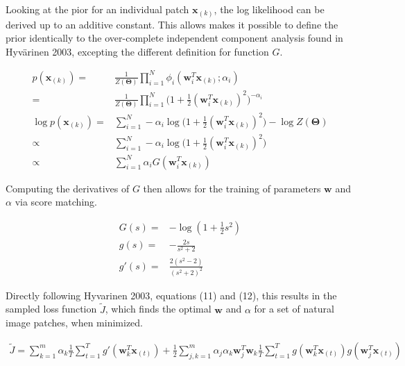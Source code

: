 \documentclass{article}
\begin{document}
Looking at the pior for an individual patch $\mathbf{x}_{(k)}$, the log likelihood can be derived up to an additive constant. This allows makes it possible to define the prior identically to the over-complete independent component analysis found in Hyvärinen 2003, excepting the different definition for function $G$. 

\begin{equation}
\begin{aligned}
	p(\mathbf{x}_{(k)}) =& \frac{1}{Z(\bm{\Theta})} \prod_{i=1}^{N} \phi_i (\mathbf{w}_i^T \mathbf{x}_{(k)} ; \alpha_i) \\
	=& \frac{1}{Z(\bm{\Theta})} \prod_{i=1}^{N} \bigg( 1 + \frac{1}{2}(\mathbf{w}_i^T \mathbf{x}_{(k)})^2 \bigg)^{-\alpha_i} \\
	\log p(\mathbf{x}_{(k)}) =& \sum_{i=1}^{N} -\alpha_i \log \bigg( 1 + \frac{1}{2}(\mathbf{w}_i^T \mathbf{x}_{(k)})^2 \bigg)  - \log Z(\bm{\Theta}) \\
	\propto& \sum_{i=1}^{N} -\alpha_i \log \bigg( 1 + \frac{1}{2}(\mathbf{w}_i^T \mathbf{x}_{(k)})^2 \bigg) \\
		\propto& \sum_{i=1}^{N} \alpha_i G(\mathbf{w}_i^T \mathbf{x}_{(k)})
\end{aligned}
\end{equation}

Computing the derivatives of $G$ then allows for the training of parameters $\mathbf{w}$ and $\alpha$ via score matching.


\begin{equation}
\begin{aligned}
	G(s) =& - \log(1 + \frac{1}{2} s^2) \\
	g(s) =& - \frac{2s}{s^2 + 2} \\
	g'(s) =& \frac{2(s^2 - 2)}{(s^2 + 2)^2}
\end{aligned}
\end{equation}

Directly following Hyvarinen 2003, equations (11) and (12), this results in the sampled loss function $\tilde{J}$, which finds the optimal $\mathbf{w}$ and $\alpha$ for a set of natural image patches, when minimized.

\begin{equation}
\begin{aligned}
\tilde{J} = \sum_{k=1}^{m} \alpha_k \frac{1}{T} \sum_{t=1}^{T} g'(\mathbf{w}_k^T \mathbf{x}_{(t)}) + \frac{1}{2} \sum_{j,k = 1}^{m} \alpha_j \alpha_k \mathbf{w}_j^T \mathbf{w}_k \frac{1}{T} \sum_{t=1}^{T} g(\mathbf{w}_k^T \mathbf{x}_{(t)}) g(\mathbf{w}_j^T \mathbf{x}_{(t)})
\end{aligned}
\end{equation}
\end{document}
